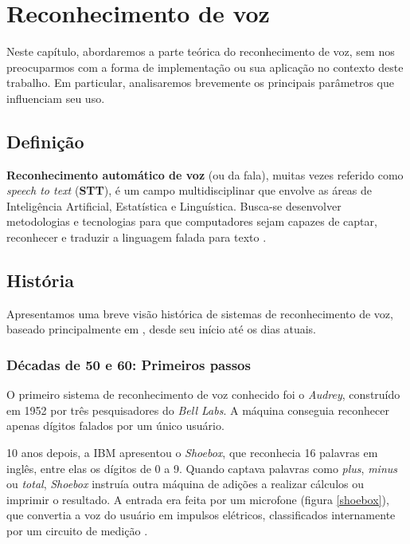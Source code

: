 \chapter{Reconhecimento de voz}
\label{cap:speech-recognition}

Neste capítulo, abordaremos a parte teórica do reconhecimento de voz, sem nos preocuparmos com a forma de implementação ou sua aplicação no contexto deste trabalho. Em particular, analisaremos brevemente os principais parâmetros que influenciam seu uso.


\section{Definição}

\textbf{Reconhecimento automático de voz} (ou da fala), muitas vezes referido como \textit{speech to text} (\textbf{STT}), é um campo multidisciplinar que envolve as áreas de Inteligência Artificial, Estatística e Linguística. Busca-se desenvolver metodologias e tecnologias para que computadores sejam capazes de captar, reconhecer e traduzir a linguagem falada para texto \citep{sttDefinition}.


\section{História}

Apresentamos uma breve visão histórica de sistemas de reconhecimento de voz, baseado principalmente em \citep{STTHistory}, desde seu início até os dias atuais.


\subsection{Décadas de 50 e 60: Primeiros passos}

O primeiro sistema de reconhecimento de voz conhecido foi o \textit{Audrey}, construído em 1952 por três pesquisadores do \textit{Bell Labs}. A máquina conseguia reconhecer apenas dígitos falados por um único usuário.

10 anos depois, a IBM apresentou o \textit{Shoebox}, que reconhecia 16 palavras em inglês, entre elas os dígitos de 0 a 9. Quando captava palavras como \textit{plus}, \textit{minus} ou \textit{total}, \textit{Shoebox} instruía outra máquina de adições a realizar cálculos ou imprimir o resultado. A entrada era feita por um microfone (figura \ref{shoebox}), que convertia a voz do usuário em impulsos elétricos, classificados internamente por um circuito de medição \citep{shoebox}.

